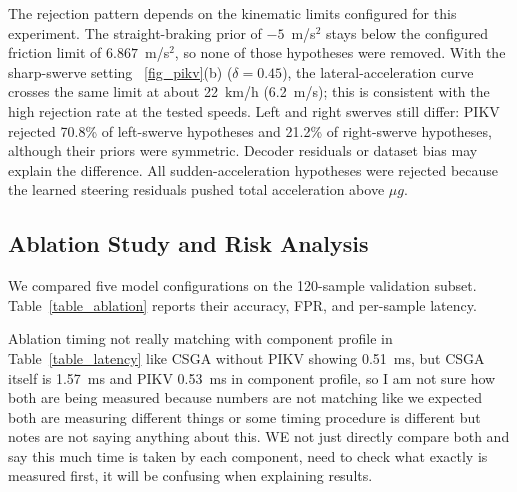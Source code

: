 \documentclass[preprint,12pt]{elsarticle}
\begin{document}
The rejection pattern depends on the kinematic limits configured for this experiment. The straight-braking prior of $-5$~m/s$^2$ stays below the configured friction limit of $6.867$~m/s$^2$, so none of those hypotheses were removed. With the sharp-swerve setting ~\ref{fig_pikv}(b) ($\delta = 0.45$), the lateral-acceleration curve crosses the same limit at about 22~km/h (6.2~m/s); this is consistent with the high rejection rate at the tested speeds. Left and right swerves still differ: PIKV rejected 70.8\% of left-swerve hypotheses and 21.2\% of right-swerve hypotheses, although their priors were symmetric. Decoder residuals or dataset bias may explain the difference. All sudden-acceleration hypotheses were rejected because the learned steering residuals pushed total acceleration above $\mu g$.

\subsection{Ablation Study and Risk Analysis}
We compared five model configurations on the 120-sample validation subset. Table~\ref{table_ablation} reports their accuracy, FPR, and per-sample latency.

\begin{table}[H]
\caption{Ablation study on the 120-sample validation split (anomaly threshold CRT $> 0.4$).}
\centering
\label{table_ablation}
\end{table}

Ablation timing not really matching with component profile in Table~\ref{table_latency} like CSGA without PIKV showing 0.51~ms, but CSGA itself is 1.57~ms and PIKV 0.53~ms in component profile, so I am not sure how both are being measured because numbers are not matching like we expected  both are measuring different things or some timing procedure is different but notes are not saying anything about this. WE not just directly compare both and say this much time is taken by each component, need to check what exactly is measured first, it will be confusing when explaining results.
\end{document}
